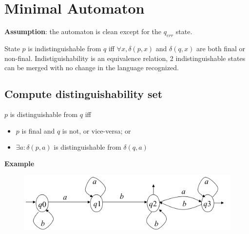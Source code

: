 \section{Minimal Automaton}

\textbf{Assumption}: the automaton is clean except for the $q_{err}$ state.

State $p$ is indistinguishable from $q$ iff $\forall x, \delta(p,x)$ and $\delta(q, x)$ are both final or non-final. Indistiguishability is an equivalence relation, 2 indistinguishable states can be merged with no change in the language recognized.

\subsection{Compute distinguishability set}
$p$ is distinguishable from $q$ iff
\begin{itemize}
    \item $p$ is final and $q$ is not, or vice-versa; or
    \item $\exists a: \delta(p, a)$ is distinguishable from $\delta(q, a)$
\end{itemize}

\textbf{Example}
\begin{figure}[H]
    \centering
    \includegraphics[width=\linewidth]{automata/example-automaton-minimization.png}
\end{figure}

